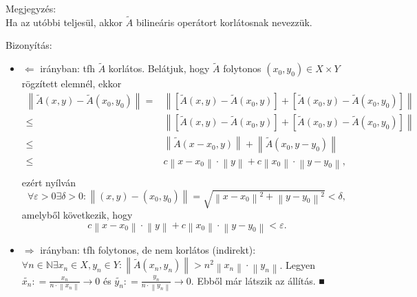 \documentclass[12pt,a4paper]{scrartcl}
\providecommand{\tightlist}{%
  \setlength{\itemsep}{0pt}\setlength{\parskip}{0pt}}
\newenvironment{bizonyitas}{}{}
\newenvironment{megjegyzes}{}{}
\begin{document}
\begin{megjegyzes}

Megjegyzés:\\
Ha az utóbbi teljesül, akkor \(\widetilde{A}\) bilineáris operátort
korlátosnak nevezzük.

\end{megjegyzes}

\begin{bizonyitas}

Bizonyítás:

\begin{itemize}
\tightlist
\item
  \(\Leftarrow\) irányban: tfh \(\widetilde{A}\) korlátos. Belátjuk,
  hogy \(\widetilde{A}\) folytonos
  \(\left( {x_{0},y_{0}} \right) \in X \times Y\) rögzített elemnél,
  ekkor \[\begin{aligned}
    \left\| {\tilde A\left( {x,y} \right) - \tilde A\left( {{x_0},{y_0}} \right)} \right\| =  & \left\| {\left[ {\tilde A\left( {x,y} \right) - \tilde A\left( {{x_0},y} \right)} \right] + \left[ {\tilde A\left( {{x_0},y} \right) - \tilde A\left( {{x_0},{y_0}} \right)} \right]} \right\| \\ 
     \leqslant  & \left\| {\left[ {\tilde A\left( {x,y} \right) - \tilde A\left( {{x_0},y} \right)} \right] + \left[ {\tilde A\left( {{x_0},y} \right) - \tilde A\left( {{x_0},{y_0}} \right)} \right]} \right\| \\ 
     \leqslant  & \left\| {\tilde A\left( {x - {x_0},y} \right)} \right\| + \left\| {\tilde A\left( {{x_0},y - {y_0}} \right)} \right\| \\ 
     \leqslant  & c\left\| {x - {x_0}} \right\| \cdot \left\| y \right\| + c\left\| {{x_0}} \right\| \cdot \left\| {y - {y_0}} \right\|, \\ 
  \end{aligned} \] ezért nyílván
  \[\forall \varepsilon  > 0\exists \delta  > 0:\left\| {\left( {x,y} \right) - \left( {{x_0},{y_0}} \right)} \right\| = \sqrt {{{\left\| {x - {x_0}} \right\|}^2} + {{\left\| {y - {y_0}} \right\|}^2}}  < \delta, \]
  amelyből következik, hogy
  \[c\left\| {x - {x_0}} \right\| \cdot \left\| y \right\| + c\left\| {{x_0}} \right\| \cdot \left\| {y - {y_0}} \right\| < \varepsilon .\]
\item
  \(\Rightarrow\) irányban: tfh folytonos, de nem korlátos (indirekt):
  \(\forall n \in {\mathbb{N}}\exists x_{n} \in X,y_{n} \in Y:\left\| {\widetilde{A}\left( {x_{n},y_{n}} \right)} \right\| > n^{2}\left\| x_{n} \right\| \cdot \left\| y_{n} \right\|\).
  Legyen
  \(\left. \widetilde{x_{n}}: = \frac{x_{n}}{n \cdot \left\| x_{n} \right\|}\rightarrow 0 \right.\)
  és
  \(\left. \widetilde{y_{n}}: = \frac{y_{n}}{n \cdot \left\| y_{n} \right\|}\rightarrow 0 \right.\).
  Ebből már látszik az állítás. ■
\end{itemize}

\end{bizonyitas}
\end{document}
